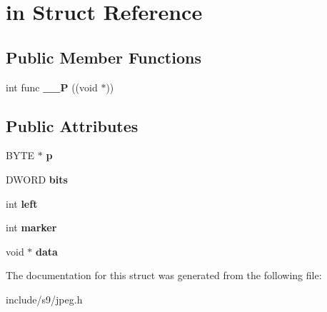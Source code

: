 \hypertarget{structin}{\section{in \-Struct \-Reference}
\label{structin}
}
\subsection*{\-Public \-Member \-Functions}
\begin{DoxyCompactItemize}
\item 
\hypertarget{structin_a5b579d0bc7c628f2f54c830588870bde}{int func {\bfseries \-\_\-\-\_\-\-P} ((void $\ast$))}\label{structin_a5b579d0bc7c628f2f54c830588870bde}

\end{DoxyCompactItemize}
\subsection*{\-Public \-Attributes}
\begin{DoxyCompactItemize}
\item 
\hypertarget{structin_a473dfe1bcb6314abd17d50c61a83ec80}{\-B\-Y\-T\-E $\ast$ {\bfseries p}}\label{structin_a473dfe1bcb6314abd17d50c61a83ec80}

\item 
\hypertarget{structin_a1a5143f47a3260569f20a5df3c2b9af2}{\-D\-W\-O\-R\-D {\bfseries bits}}\label{structin_a1a5143f47a3260569f20a5df3c2b9af2}

\item 
\hypertarget{structin_ae936267e9dc755c6603765fe3a24c6b7}{int {\bfseries left}}\label{structin_ae936267e9dc755c6603765fe3a24c6b7}

\item 
\hypertarget{structin_a18f3590ff3e1875cb36250d51eb1860d}{int {\bfseries marker}}\label{structin_a18f3590ff3e1875cb36250d51eb1860d}

\item 
\hypertarget{structin_a7d0698d52948ac4427e4133655fc47cc}{void $\ast$ {\bfseries data}}\label{structin_a7d0698d52948ac4427e4133655fc47cc}

\end{DoxyCompactItemize}


\-The documentation for this struct was generated from the following file\-:\begin{DoxyCompactItemize}
\item 
include/s9/jpeg.\-h\end{DoxyCompactItemize}
